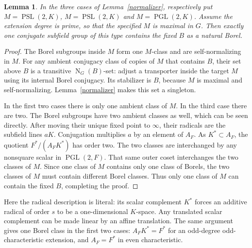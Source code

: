 \documentclass[11pt]{article}
\newtheorem{lemma}{Lemma}\newtheorem{theorem}[lemma]{Theorem}
\newcommand{\PSL}{\operatorname{PSL}}\newcommand{\PGL}{\operatorname{PGL}}
\newcommand{\N}{\operatorname{N}}\newcommand{\F}{\mathbb F}
\begin{document}
\begin{lemma}\label{unique}
In the three cases of Lemma~\ref{normalizer}, respectively put
$M=\PSL(2,K)$, $M=\PSL(2,K)$ and $M=\PGL(2,K)$.
Assume the extension degree is prime, so that the specified $M$ is
maximal in $G$. Then exactly one conjugate subfield group of this
type contains the fixed $B$ as a natural Borel.
\end{lemma}
\begin{proof}
The Borel subgroups inside $M$ form one $M$-class and are
self-normalizing in $M$. For any ambient conjugacy class of copies
of $M$ that contains $B$, their set above $B$ is a transitive
$\N_G(B)$-set: adjust a transporter inside the target $M$ using
its internal Borel conjugacy. Its stabilizer is $B$, because $M$
is maximal and self-normalizing. Lemma~\ref{normalizer} makes this
set a singleton.

In the first two cases there is only one ambient class of $M$.
In the third case there are two. The Borel subgroups have two ambient
classes as well, which can be seen directly. After moving their
unique fixed point to $\infty$, their radicals are the subfield
lines $aK$. Conjugation multiplies $a$ by an element of $A_F$.
As $K^*\subset A_F$, the quotient $F^*/(A_F K^*)$ has order two.
The two classes are interchanged by any nonsquare scalar in
$\PGL(2,F)$. That same outer coset interchanges the two classes
of $M$. Since one class of $M$ contains only one class of Borels,
the two classes of $M$ must contain different Borel classes. Thus
only one class of $M$ can contain the fixed $B$, completing the proof.
\end{proof}

Here the radical description is literal: its scalar complement
$K^*$ forces an additive radical of order $s$ to be a one-dimensional
$K$-space. Any translated scalar complement can be made linear by
an affine translation. The same argument gives one Borel class in
the first two cases: $A_F K^*=F^*$ for an odd-degree odd-characteristic
extension, and $A_F=F^*$ in even characteristic.
\end{document}
